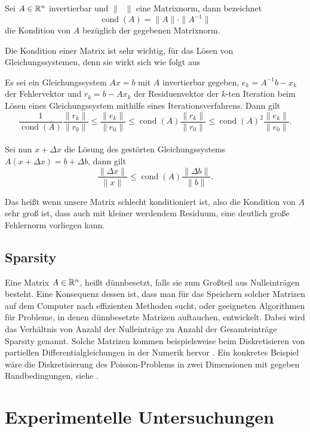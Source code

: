 \documentclass{scrartcl}
\begin{document}
\begin{definition}\cite[p.~25]{Iterative}
    Sei \(A \in \mathbb{R}^n\) invertierbar und \(\| \phantom{x}\|\) eine Matrixnorm, dann bezeichnet
    \[\operatorname{cond}(A)=\|A\| \cdot\|A^{-1}\|\]
    die Kondition von \(A\) bezüglich der gegebenen Matrixnorm.
\end{definition}
Die Kondition einer Matrix ist sehr wichtig, für das Lösen von Gleichungssystemen, denn sie wirkt sich wie folgt aus
\begin{theorem}\cite[p.~26-27]{Iterative}
    Es sei ein Gleichungssystem \(Ax=b\) mit \(A\) invertierbar gegeben, \(e_k = A^{-1}b-x_k\) der Fehlervektor und \(r_k = b - Ax_k\) der Residuenvektor der \(k\)-ten Iteration beim Lösen eines Gleichungssystem mithilfe eines Iterationsverfahrens.
    Dann gilt
    \[\frac{1}{\operatorname{cond}(A)} \frac{\|r_k\|}{\|r_0\|} \leq \frac{\|e_k\|}{\|e_0\|} \leq \operatorname{cond}(A) \frac{\|r_k\|}{\|r_0\|} \leq \operatorname{cond}(A)^2 \frac{\|e_k\|}{\|e_0\|}.\]
    \\
    Sei nun \(x+\Delta x\) die Lösung des gestörten Gleichungssystems \(A(x + \Delta x)= b+ \Delta b\), dann gilt
    \[\frac{\|\Delta x\|}{\|x\|} \leq \operatorname{cond}(A) \frac{\|\Delta b\|}{\|b\|}.\]
\end{theorem}
Das heißt wenn unsere Matrix schlecht konditioniert ist, also die Kondition von \(A\) sehr groß ist, dass auch mit kleiner werdendem Residuum, eine deutlich große Fehlernorm vorliegen kann.

\subsection{Sparsity}
Eine Matrix \(A \in \mathbb{R}^n \), heißt dünnbesetzt, falls sie zum Großteil aus
Nulleinträgen besteht. Eine Konsequenz dessen ist, dass man für das Speichern
solcher Matrizen auf dem Computer nach effizienten Methoden sucht, oder
geeigneten Algorithmen für Probleme, in denen dünnbesetzte Matrizen auftauchen,
entwickelt. Dabei wird das Verhältnis von Anzahl der Nulleinträge zu Anzahl der
Gesamteinträge Sparsity genannt. Solche Matrizen kommen beispielsweise beim
Diskretisieren von partiellen Differentialgleichungen in der Numerik hervor
\cite{dewiki:233309191}. Ein konkretes Beispiel wäre die Diskretisierung des
Poisson-Problems in zwei Dimensionen mit gegeben Randbedingungen, siehe
\cite{HandoutLU}.

\section{Experimentelle Untersuchungen}
\end{document}
